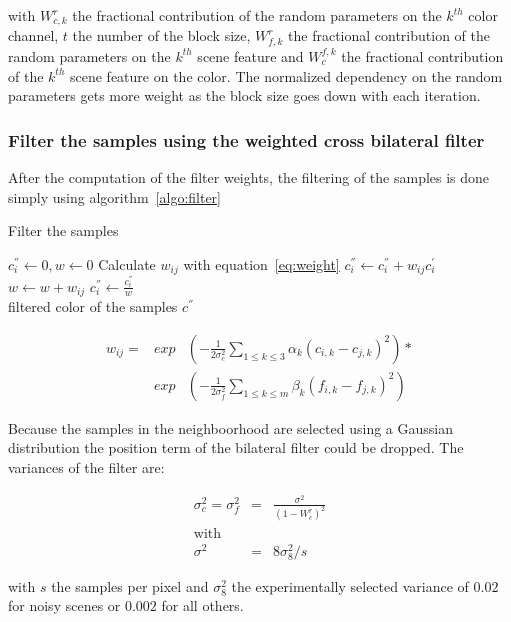 with $W_{c,k}^r$ the fractional contribution of the random parameters on the $k^{th}$ color channel,
$t$ the number of the block size, $W_{f,k}^{r}$ the fractional contribution of the random parameters on the $k^{th}$ scene feature and
$W_{c}^{f,k}$ the fractional contribution of the $k^{th}$ scene feature  on the color.
The normalized dependency on the random parameters gets more weight as the block size goes down with each iteration.

\subsubsection{Filter the samples using the weighted cross bilateral filter}
After the computation of the filter weights, the filtering of the samples is done simply using algorithm~\ref{algo:filter}

\begin{algorithm} 
  \caption{Filter the samples}
  \label{algo:filter}
  \begin{algorithmic}
      \State $c_i^{''} \leftarrow 0, w \leftarrow 0$
	 \State Calculate $w_{ij}$ with equation~\ref{eq:weight}
	 \State $c_i^{''} \leftarrow c_i^{''} + w_{ij}c_i^{'}$
	 \State $w \leftarrow w + w_{ij}$
      \EndFor
      \State $c_i^{''} \leftarrow \frac{c_i^{''}}{w}$
    \EndFor \\
    \Return filtered color of the samples $c^{''}$
  \end{algorithmic}
\end{algorithm}

\begin{equation} \label{eq:weight}
  \begin{aligned}
 w_{ij} = &exp&(-\frac{1}{2\sigma_{c}^{2}}\sum_{1\leq k\leq3}\alpha_k(c_{i,k}-c_{j,k})^2)* \\
	  &exp&(-\frac{1}{2\sigma_{f}^{2}}\sum_{1\leq k\leq m}\beta_k(f_{i,k}-f_{j,k})^2)
  \end{aligned}
\end{equation}

Because the samples in the neighboorhood are selected using a Gaussian distribution the position term of the bilateral filter could be dropped.
The variances of the filter are:

\begin{equation}
 \begin{aligned}
    \sigma_c^{2} = \sigma_f^{2} &=& \frac{\sigma^2}{(1-W_c^r)^2} \\
    \text{with } \\
    \sigma^2 &=& 8\sigma_8^2/s
 \end{aligned}
\end{equation}

with $s$ the samples per pixel and $\sigma_8^2$ the experimentally selected variance of $0.02$ for noisy scenes or $0.002$ for all others.

